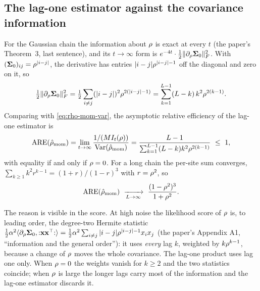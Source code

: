\subsection{The lag-one estimator against the covariance information}

For the Gaussian chain the information about $\rho$ is exact at every $t$
(the paper's Theorem~3, last sentence), and its $t\to\infty$ form is
$e^{-4t}\cdot\tfrac12\lVert \partial_\rho\mathbf{\Sigma}_0 \rVert_{F}^2$. With
$(\mathbf{\Sigma}_0)_{ij}=\rho^{|i-j|}$, the derivative has entries
$|i-j|\rho^{|i-j|-1}$ off the diagonal and zero on it, so
\begin{equation}
  \tfrac12\lVert \partial_\rho\mathbf{\Sigma}_0 \rVert_{F}^2=\tfrac12\sum_{i\ne j}(|i-j|)^2\rho^{2(|i-j|-1)}
  =\sum_{k=1}^{L-1}(L-k)\,k^2\rho^{2(k-1)}.
  \label{eq:info-rho-constant}
\end{equation}
Comparing with \cref{eq:rho-mom-var}, the asymptotic relative efficiency of the lag-one
estimator is
\begin{equation}
  \mathrm{ARE}(\hat\corr_{\mathrm{mom}})=\lim_{t\to\infty}\frac{1/(\nseq I_t(\corr))}{\Var(\hat\corr_{\mathrm{mom}})}
  =\frac{\nsites-1}{\sum_{k=1}^{\nsites-1}(\nsites-k)k^2\corr^{2(k-1)}}\ \le\ 1,
  \label{eq:are-rho}
\end{equation}
with equality if and only if $\rho=0$. For a long chain the per-site sum converges,
$\sum_{k\ge1}k^2r^{k-1}=(1+r)/(1-r)^3$ with $r=\rho^2$, so
\begin{equation}
  \mathrm{ARE}(\hat\corr_{\mathrm{mom}})\ \xrightarrow[\nsites\to\infty]{}\ \frac{(1-\corr^2)^3}{1+\corr^2}.
  \label{eq:are-rho-long}
\end{equation}

The reason is visible in the score. At high noise the likelihood score of $\rho$ is, to
leading order, the degree-two Hermite statistic
$\tfrac12\alpha^2\langle\partial_\rho\mathbf{\Sigma}_0,{:}\mathbf{x}\mathbf{x}^\top{:}\rangle=\tfrac12\alpha^2\sum_{i\ne j}|i-j|\rho^{|i-j|-1}x_ix_j$
(the paper's Appendix A1, ``information and the general order''): it uses \emph{every}
lag $k$, weighted by $k\rho^{k-1}$, because a change of $\rho$ moves the whole
covariance. The lag-one product uses lag one only. When $\rho=0$ the weights vanish for
$k\ge2$ and the two statistics coincide; when $\rho$ is large the longer lags carry most
of the information and the lag-one estimator discards it.

